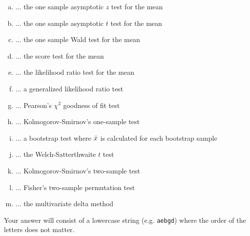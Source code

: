 \documentclass[12pt,landscape]{article}
\newcommand{\instr}{\small Your answer will consist of a lowercase string (e.g. \texttt{aebgd}) where the order of the letters does not matter. \normalsize}
\begin{document}
\vspace{-0.1cm}\benum{} 
\begin{enumerate}[(a)]
\item ... the one sample asymptotic $z$ test for the mean
\item ... the one sample asymptotic $t$ test for the mean
\item ... the one sample Wald test for the mean
\item ... the score test for the mean
\item ... the likelihood ratio test for the mean
\item ... a generalized likelihood ratio test
\item ... Pearson's $\chi^2$ goodness of fit test
\item ... Kolmogorov-Smirnov's one-sample test
\item ... a bootstrap test where $\bar{x}$ is calculated for each bootstrap sample
\item ... the Welch-Satterthwaite $t$ test
\item ... Kolmogorov-Smirnov's two-sample test
\item ... Fisher's two-sample permutation test
\item ... the multivariate delta method
\end{enumerate}
\eenum\instr\pagebreak
\end{document}
